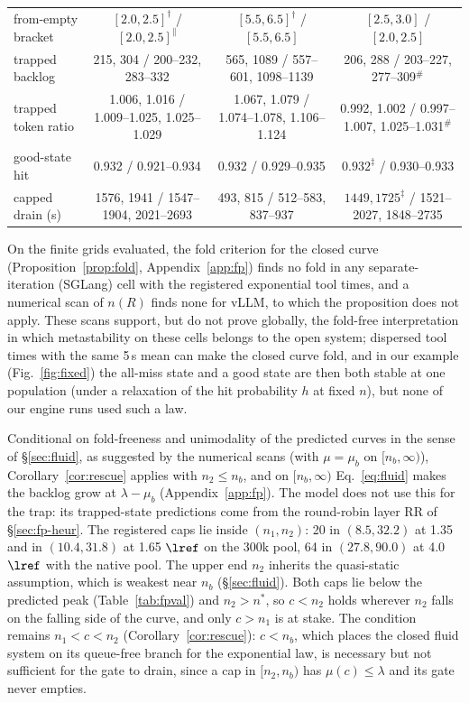 \begin{table}[t]
\begin{tabular}{@{}lccc@{}}
from-empty bracket & $[2.0,2.5]^\dagger$ / $[2.0,2.5]^\|$ & $[5.5,6.5]^\dagger$ / $[5.5,6.5]$ & $[2.5,3.0]$ / $[2.0,2.5]$\\
trapped backlog & 215, 304 / 200--232, 283--332 & 565, 1089 / 557--601, 1098--1139 & 206, 288 / 203--227, 277--309$^{\#}$\\
trapped token ratio & 1.006, 1.016 / 1.009--1.025, 1.025--1.029 & 1.067, 1.079 / 1.074--1.078, 1.106--1.124 & 0.992, 1.002 / 0.997--1.007, 1.025--1.031$^{\#}$\\
good-state hit & 0.932 / 0.921--0.934 & 0.932 / 0.929--0.935 & $0.932^\ddagger$ / 0.930--0.933\\
capped drain (s) & 1576, 1941 / 1547--1904, 2021--2693 & 493, 815 / 512--583, 837--937 & $1449, 1725^\ddagger$ / 1521--2027, 1848--2735\\\bottomrule
\end{tabular}
\end{table}

On the finite grids evaluated, the fold criterion for the closed curve (Proposition~\ref{prop:fold}, Appendix~\ref{app:fp}) finds no fold in any separate-iteration (SGLang) cell with the registered exponential tool times, and a numerical scan of $n(R)$ finds none for vLLM, to which the proposition does not apply. These scans support, but do not prove globally, the fold-free interpretation in which metastability on these cells belongs to the open system; dispersed tool times with the same 5\,s mean can make the closed curve fold, and in our example (Fig.~\ref{fig:fixed}) the all-miss state and a good state are then both stable at one population (under a relaxation of the hit probability $h$ at fixed $n$), but none of our engine runs used such a law.

Conditional on fold-freeness and unimodality of the predicted curves in the sense of \S\ref{sec:fluid}, as suggested by the numerical scans (with $\mu=\mu_b$ on $[n_b,\infty)$), Corollary~\ref{cor:rescue} applies with $n_2\le n_b$, and on $[n_b,\infty)$ Eq.~\eqref{eq:fluid} makes the backlog grow at $\lambda-\mu_b$ (Appendix~\ref{app:fp}). The model does not use this for the trap: its trapped-state predictions come from the round-robin layer RR of \S\ref{sec:fp-heur}. The registered caps lie inside $(n_1,n_2)$: 20 in $(8.5,32.2)$ at 1.35 and in $(10.4,31.8)$ at 1.65 $\lref$ on the 300k pool, 64 in $(27.8,90.0)$ at 4.0 $\lref$ with the native pool. The upper end $n_2$ inherits the quasi-static assumption, which is weakest near $n_b$ (\S\ref{sec:fluid}). Both caps lie below the predicted peak (Table~\ref{tab:fpval}) and $n_2>n^*$, so $c<n_2$ holds wherever $n_2$ falls on the falling side of the curve, and only $c>n_1$ is at stake. The condition remains $n_1<c<n_2$ (Corollary~\ref{cor:rescue}): $c<n_b$, which places the closed fluid system on its queue-free branch for the exponential law, is necessary but not sufficient for the gate to drain, since a cap in $[n_2,n_b)$ has $\mu(c)\le\lambda$ and its gate never empties.

